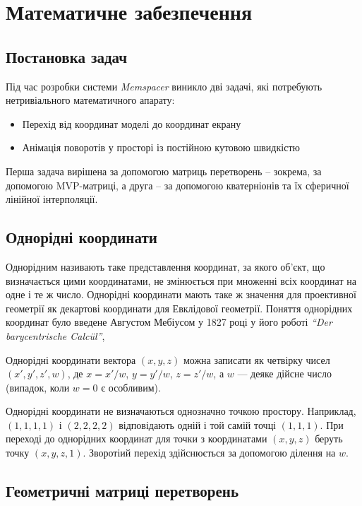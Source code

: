 \section{Математичне забезпечення}

\subsection{Постановка задач}

Під час розробки системи \emph{Memspacer} виникло дві задачі, які потребують нетривіального математичного апарату:
\begin{itemize}
  \item Перехід від координат моделі до координат екрану
  \item Анімація поворотів у просторі із постійною кутовою швидкістю
\end{itemize}

Перша задача вирішена за допомогою матриць перетворень -- зокрема, за допомогою MVP-матриці, а друга -- за допомогою кватерніонів та їх сферичної лінійної інтерполяції.

\subsection{Однорідні координати}

Однорідним називають таке представлення координат, за якого об'єкт, що визначається цими координатами, не змінюється при множенні всіх координат на одне і те ж число. Однорідні координати мають таке ж значення для проективної геометрії як декартові координати для Евклідової геометрії. Поняття однорідних координат було введене Августом Мебіусом у 1827 році у його роботі \emph{``Der barycentrische Calc\"ul''}\cite{mobius},

Однорідні координати вектора $(x,y,z)$ можна записати як четвірку чисел $(x',y',z',w)$, де $x=x'/w$, $y=y'/w$, $z=z'/w$, а $w$ — деяке дійсне число (випадок, коли $w = 0$ є особливим).

Однорідні координати не визначаються однозначно точкою простору. Наприклад, $(1,1,1,1)$ і $(2,2,2,2)$ відповідають одній і той самій точці $(1,1,1)$. При переході до однорідних координат для точки з координатами $(x,y,z)$ беруть точку $(x,y,z,1)$. Зворотіий перехід здійснюється за допомогою ділення на $w$.

\subsection{Геометричні матриці перетворень}

